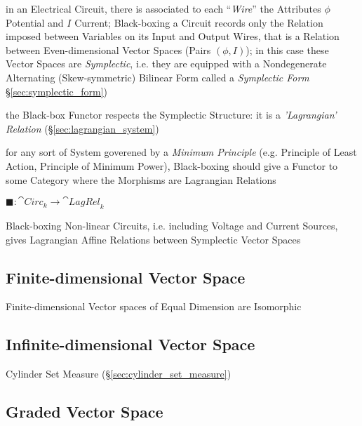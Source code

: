 in an Electrical Circuit, there is associated to each ``\emph{Wire}'' the
Attributes $\phi$ Potential and $I$ Current; Black-boxing a Circuit records
only the Relation imposed between Variables on its Input and Output Wires, that
is a Relation between Even-dimensional Vector Spaces (Pairs $(\phi,I)$); in
this case these Vector Spaces are \emph{Symplectic}, i.e. they are equipped
with a Nondegenerate Alternating (Skew-symmetric) Bilinear Form called a
\emph{Symplectic Form} \S\ref{sec:symplectic_form})

the Black-box Functor respects the Symplectic Structure: it is a
\emph{'Lagrangian' Relation} (\S\ref{sec:lagrangian_system})

for any sort of System goverened by a \emph{Minimum Principle} (e.g. Principle
of Least Action, Principle of Minimum Power), Black-boxing should give a
Functor to some Category where the Morphisms are Lagrangian Relations

$\blacksquare : \cat{Circ}_k \rightarrow \cat{LagRel}_k$

Black-boxing Non-linear Circuits, i.e. including Voltage and Current Sources,
gives Lagrangian Affine Relations between Symplectic Vector Spaces



\subsection{Finite-dimensional Vector Space}
\label{sec:finite_dimensional_vectorspace}

Finite-dimensional Vector spaces of Equal Dimension are Isomorphic



\subsection{Infinite-dimensional Vector Space}
\label{sec:infinite_dimensional_vectorspace}

Cylinder Set Measure (\S\ref{sec:cylinder_set_measure})



\subsection{Graded Vector Space}\label{sec:graded_vectorspace}

